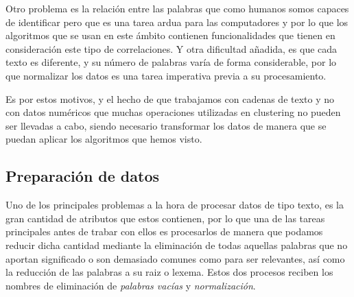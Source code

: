 \documentclass[10pt, a4paper]{article}
\begin{document}
Otro problema es la relación entre las palabras que como humanos somos capaces de identificar pero que es una tarea ardua para las computadores y por lo que los algoritmos que se usan en este ámbito contienen funcionalidades que tienen en consideración este tipo de correlaciones. Y otra dificultad añadida, es que cada texto es diferente, y su número de palabras varía de forma considerable, por lo que normalizar los datos es una tarea imperativa previa a su procesamiento. 

Es por estos motivos, y el hecho de que trabajamos con cadenas de texto y no con datos numéricos que muchas operaciones utilizadas en clustering no pueden ser llevadas a cabo, siendo necesario transformar los datos de manera que se puedan aplicar los algoritmos que hemos visto.



\subsection{Preparación de datos} \label{subsec:preparación de datos}

Uno de los principales problemas a la hora de procesar datos de tipo texto, es la gran cantidad de atributos que estos contienen, por lo que una de las tareas principales antes de trabar con ellos es procesarlos de manera que podamos reducir dicha cantidad mediante la eliminación de todas aquellas palabras que no aportan significado o son demasiado comunes como para ser relevantes, así como la reducción de las palabras a su raiz o lexema. Estos dos procesos reciben los nombres de eliminación de \textit{palabras vacías} y \textit{normalización}.
\end{document}
